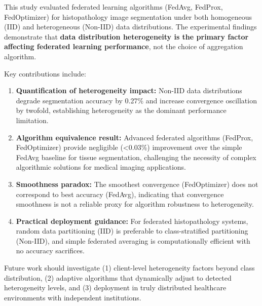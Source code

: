 \documentclass[conference]{IEEEtran}
\begin{document}
This study evaluated federated learning algorithms (FedAvg, FedProx, FedOptimizer) for histopathology image segmentation under both homogeneous (IID) and heterogeneous (Non-IID) data distributions. The experimental findings demonstrate that \textbf{data distribution heterogeneity is the primary factor affecting federated learning performance}, not the choice of aggregation algorithm.

Key contributions include:

\begin{enumerate}
\item \textbf{Quantification of heterogeneity impact:} Non-IID data distributions degrade segmentation accuracy by 0.27\% and increase convergence oscillation by twofold, establishing heterogeneity as the dominant performance limitation.

\item \textbf{Algorithm equivalence result:} Advanced federated algorithms (FedProx, FedOptimizer) provide negligible (<0.03\%) improvement over the simple FedAvg baseline for tissue segmentation, challenging the necessity of complex algorithmic solutions for medical imaging applications.

\item \textbf{Smoothness paradox:} The smoothest convergence (FedOptimizer) does not correspond to best accuracy (FedAvg), indicating that convergence smoothness is not a reliable proxy for algorithm robustness to heterogeneity.

\item \textbf{Practical deployment guidance:} For federated histopathology systems, random data partitioning (IID) is preferable to class-stratified partitioning (Non-IID), and simple federated averaging is computationally efficient with no accuracy sacrifices.
\end{enumerate}

Future work should investigate (1) client-level heterogeneity factors beyond class distribution, (2) adaptive algorithms that dynamically adjust to detected heterogeneity levels, and (3) deployment in truly distributed healthcare environments with independent institutions.
\end{document}
